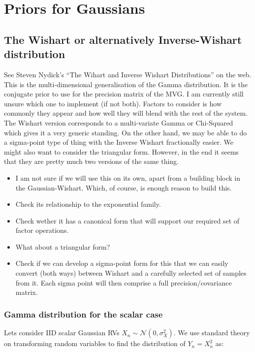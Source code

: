 \chapter{Priors for Gaussians}


\section{The Wishart or alternatively Inverse-Wishart distribution}

See Steven Nydick's ``The Wihart and Inverse Wishart Distributions''
on the web. This is the multi-dimensional generalisation of the Gamma
distribution. It is the conjugate prior to use for the precision matrix
of the MVG. I am currently still unsure which one to implement (if
not both). Factors to consider is how commonly they appear and how
well they will blend with the rest of the system. The Wishart version
corresponds to a multi-variate Gamma or Chi-Squared which gives it
a very generic standing. On the other hand, we may be able to do a
sigma-point type of thing with the Inverse Wishart fractionally easier.
We might also want to consider the triangular form. However, in the
end it seems that they are pretty much two versions of the same thing.
\begin{itemize}
\item I am not sure if we will use this on its own, apart from a building
block in the Gaussian-Wishart. Which, of course, is enough reason
to build this.
\item Check its relationship to the exponential family.
\item Check wether it has a canonical form that will support our required
set of factor operations.
\item What about a triangular form?
\item Check if we can develop a sigma-point form for this that we can easily
convert (both ways) between Wishart and a carefully selected set of
samples from it. Each sigma point will then comprise a full precision/covariance
matrix.
\end{itemize}

\subsection{Gamma distribution for the scalar case}

Lets consider IID scalar Gaussian RVs $X_{n}\sim\mathcal{N}(0,\sigma_{X}^{2})$.
We use standard theory on transforming random variables to find the
distribution of $Y_{n}=X_{n}^{2}$ as:

